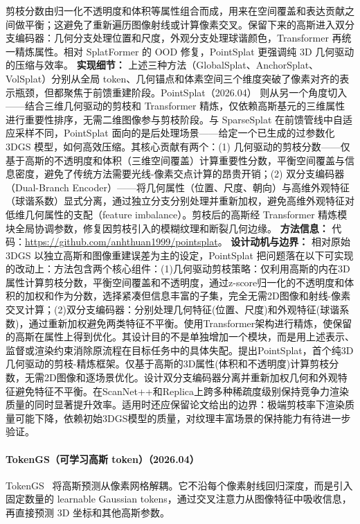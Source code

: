 剪枝分数由归一化不透明度和体积等属性组合而成，用来在空间覆盖和表达贡献之间做平衡；这避免了重新遍历图像射线或计算像素交叉。保留下来的高斯进入双分支编码器：几何分支处理位置和尺度，外观分支处理球谐颜色，Transformer 再统一精炼属性。相对 SplatFormer 的 OOD 修复，PointSplat 更强调纯 3D 几何驱动的压缩与效率。
\textbf{实现细节：} 上述三种方法（GlobalSplat、AnchorSplat、VolSplat）分别从全局 token、几何锚点和体素空间三个维度突破了像素对齐的表示瓶颈，但都聚焦于前馈重建阶段。PointSplat（2026.04） 则从另一个角度切入——结合三维几何驱动的剪枝和 Transformer 精炼，仅依赖高斯基元的三维属性进行重要性排序，无需二维图像参与剪枝阶段。与 SparseSplat 在前馈管线中自适应采样不同，PointSplat 面向的是后处理场景——给定一个已生成的过参数化 3DGS 模型，如何高效压缩。其核心贡献有两个：(1) 几何驱动的剪枝分数——仅基于高斯的不透明度和体积（三维空间覆盖）计算重要性分数，平衡空间覆盖与信息密度，避免了传统方法需要光线-像素交点计算的昂贵开销；(2) 双分支编码器（Dual-Branch Encoder）——将几何属性（位置、尺度、朝向）与高维外观特征（球谐系数）显式分离，通过独立分支分别处理并重新加权，避免高维外观特征对低维几何属性的支配（feature imbalance）。剪枝后的高斯经 Transformer 精炼模块全局协调参数，修复因剪枝引入的模糊纹理和断裂几何边缘。
\textbf{方法信息：} 代码：\url{https://github.com/anhthuan1999/pointsplat}。
\textbf{设计动机与边界：} 相对原始 3DGS 以独立高斯和图像重建误差为主的设定，PointSplat 把问题落在以下可实现的改动上：方法包含两个核心组件：(1)几何驱动剪枝策略：仅利用高斯的内在3D属性计算剪枝分数，平衡空间覆盖和不透明度，通过z-score归一化的不透明度和体积的加权和作为分数，选择紧凑但信息丰富的子集，完全无需2D图像和射线-像素交叉计算；(2)双分支编码器：分别处理几何特征(位置、尺度)和外观特征(球谐系数)，通过重新加权避免两类特征不平衡。使用Transformer架构进行精炼，使保留的高斯在属性上得到优化。其设计目的不是单独增加一个模块，而是用上述表示、监督或渲染约束消除原流程在目标任务中的具体失配。提出PointSplat，首个纯3D几何驱动的剪枝-精炼框架。仅基于高斯的3D属性(体积和不透明度)计算剪枝分数，无需2D图像和逐场景优化。设计双分支编码器分离并重新加权几何和外观特征避免特征不平衡。在ScanNet++和Replica上跨多种稀疏度级别保持竞争力渲染质量的同时显著提升效率。适用时还应保留论文给出的边界：极端剪枝率下渲染质量可能下降，依赖初始3DGS模型的质量，对纹理丰富场景的保持能力有待进一步验证。
\paragraph{TokenGS（可学习高斯 token）（2026.04）}
TokenGS~\cite{2604_15239} 将高斯预测从像素网格解耦。它不沿每个像素射线回归深度，而是引入固定数量的 learnable Gaussian tokens，通过交叉注意力从图像特征中吸收信息，再直接预测 3D 坐标和其他高斯参数。

